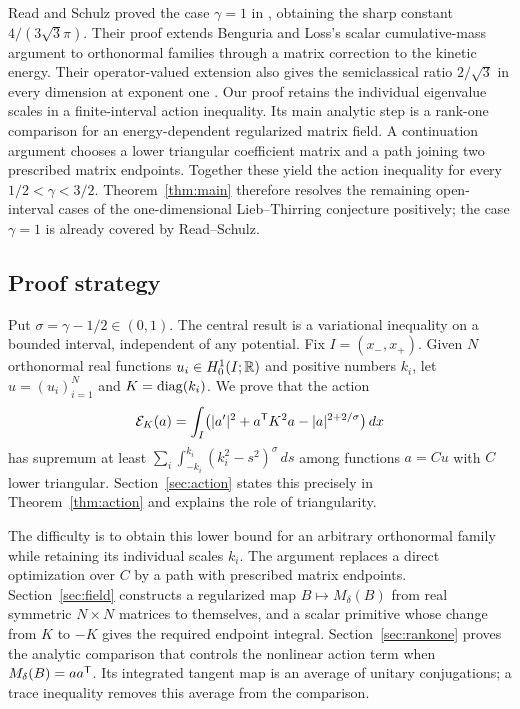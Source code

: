 Read and Schulz proved the case $\gamma=1$ in
\cite[Theorem~1]{ReadSchulz2026}, obtaining the sharp constant
$4/(3\sqrt3\pi)$. Their proof extends Benguria and Loss's scalar
cumulative-mass argument \cite[Section~2]{BenguriaLoss2004} to
orthonormal families through a matrix correction to the kinetic energy.
Their operator-valued extension also gives the semiclassical ratio
$2/\sqrt3$ in every dimension at exponent one
\cite[Theorem~2 and Section~2]{ReadSchulz2026}.
Our proof retains the individual eigenvalue scales in a finite-interval
action inequality. Its main analytic step is a rank-one comparison for
an energy-dependent regularized matrix field. A continuation argument
chooses a lower triangular coefficient matrix and a path joining two
prescribed matrix endpoints. Together these yield the action inequality
for every $1/2<\gamma<3/2$. Theorem~\ref{thm:main} therefore resolves
the remaining open-interval cases of the one-dimensional Lieb--Thirring
conjecture positively; the case $\gamma=1$ is already covered by
Read--Schulz.

\subsection{Proof strategy}

Put $\sigma=\gamma-1/2\in(0,1)$. The central result is a variational
inequality on a bounded interval, independent of any potential.
Fix $I=(x_-,x_+)$. Given $N$ orthonormal real functions
$u_i\in H^1_0(I;\mathbb R)$ and positive numbers
$k_i$, let $u=(u_i)_{i=1}^N$ and $K=\operatorname{diag}(k_i)$. We prove that the action
\[
 \mathcal E_K(a)=\int_I\bigl(|a'|^2+a^{\mathsf T}K^2a
                         -|a|^{2+2/\sigma}\bigr)\,dx
\]
has supremum at least
$\sum_i\int_{-k_i}^{k_i}(k_i^2-s^2)^\sigma\,ds$
among functions $a=Cu$ with $C$ lower triangular.
Section~\ref{sec:action} states this precisely in
Theorem~\ref{thm:action} and explains the role of triangularity.

The difficulty is to obtain this lower bound for an arbitrary orthonormal
family while retaining its individual scales $k_i$. The argument replaces
a direct optimization over $C$ by a path with prescribed matrix endpoints.
Section~\ref{sec:field} constructs a regularized map $B\mapsto M_\delta(B)$
from real symmetric $N\times N$ matrices to themselves, and a scalar
primitive whose change from $K$ to $-K$ gives the required
endpoint integral. Section~\ref{sec:rankone} proves the analytic comparison
that controls the nonlinear action term when $M_\delta(B)=aa^{\mathsf T}$.
Its integrated tangent map is an average of unitary
conjugations; a trace inequality removes this average from the comparison.

